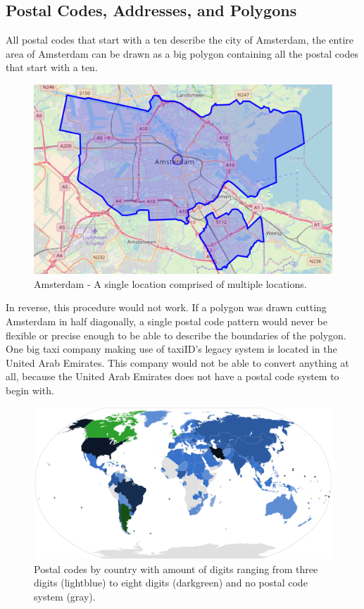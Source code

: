\subsection{Postal Codes, Addresses, and Polygons}
All postal codes that start with a ten describe the city of Amsterdam, the entire area of Amsterdam can be drawn as a big polygon containing all the postal codes that start with a ten.

\begin{figure}[H]
	\centering
	\includegraphics[width=.8\textwidth]{Amsterdam}
	\caption[Amsterdam]{Amsterdam - A single location comprised of multiple locations.}
	\label{fig:Amsterdam}
\end{figure}

In reverse, this procedure would not work. If a polygon was drawn cutting Amsterdam in half diagonally, a single postal code pattern would never be flexible or precise enough to be able to describe the boundaries of the polygon. One big taxi company making use of taxiID's legacy system is located in the United Arab Emirates. This company would not be able to convert anything at all, because the United Arab Emirates does not have a postal code system to begin with.

\begin{figure}[H]
	\centering
	\includegraphics[width=.8\textwidth]{PostalCodes}
	\caption[PostalCodes]{Postal codes by country with amount of digits ranging from three digits (lightblue) to eight digits (darkgreen) and no postal code system (gray).}
	\label{fig:postalcodes}
\end{figure}

